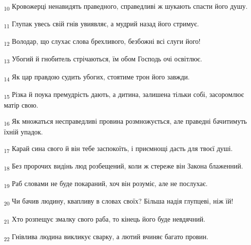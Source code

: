 \begin{tcolorbox}
\textsubscript{10} Кровожерці ненавидять праведного, справедливі ж шукають спасти його душу.
\end{tcolorbox}
\begin{tcolorbox}
\textsubscript{11} Глупак увесь свій гнів увиявляє, а мудрий назад його стримує.
\end{tcolorbox}
\begin{tcolorbox}
\textsubscript{12} Володар, що слухає слова брехливого, безбожні всі слуги його!
\end{tcolorbox}
\begin{tcolorbox}
\textsubscript{13} Убогий й гнобитель стрічаються, їм обом Господь очі освітлює.
\end{tcolorbox}
\begin{tcolorbox}
\textsubscript{14} Як цар правдою судить убогих, стоятиме трон його завжди.
\end{tcolorbox}
\begin{tcolorbox}
\textsubscript{15} Різка й поука премудрість дають, а дитина, залишена тільки собі, засоромлює матір свою.
\end{tcolorbox}
\begin{tcolorbox}
\textsubscript{16} Як множаться несправедливі провина розмножується, але праведні бачитимуть їхній упадок.
\end{tcolorbox}
\begin{tcolorbox}
\textsubscript{17} Карай сина свого й він тебе заспокоїть, і приємнощі дасть для твоєї душі.
\end{tcolorbox}
\begin{tcolorbox}
\textsubscript{18} Без пророчих видінь люд розбещений, коли ж стереже він Закона блаженний.
\end{tcolorbox}
\begin{tcolorbox}
\textsubscript{19} Раб словами не буде покараний, хоч він розуміє, але не послухає.
\end{tcolorbox}
\begin{tcolorbox}
\textsubscript{20} Чи бачив людину, квапливу в словах своїх? Більша надія глупцеві, ніж їй!
\end{tcolorbox}
\begin{tcolorbox}
\textsubscript{21} Хто розпещує змалку свого раба, то кінець його буде невдячний.
\end{tcolorbox}
\begin{tcolorbox}
\textsubscript{22} Гнівлива людина викликує сварку, а лютий вчиняє багато провин.
\end{tcolorbox}
